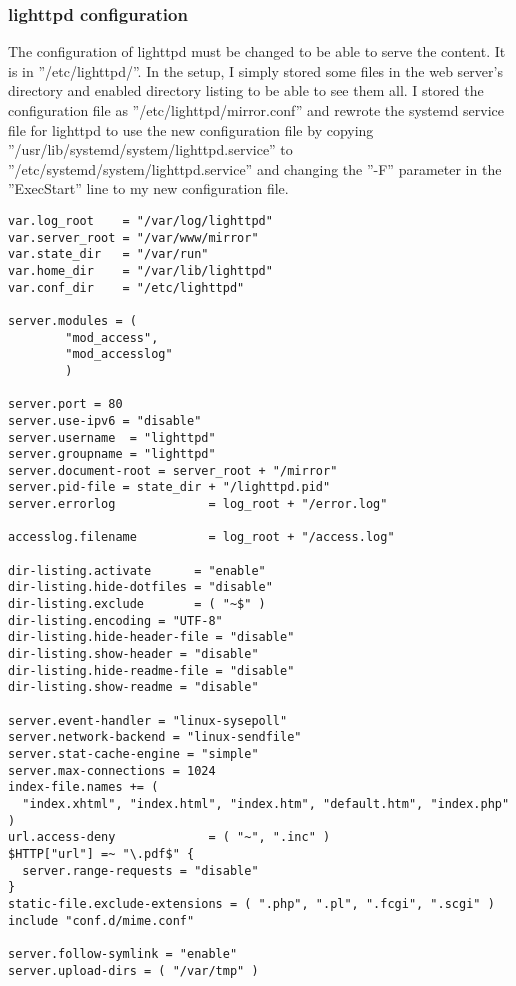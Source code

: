 \subsubsection{lighttpd configuration}
The configuration of lighttpd must be changed to be able to serve the content.
It is in ''/etc/lighttpd/''. In the setup, I simply stored some files in the web
server's directory and enabled directory listing to be able to see them all.
I stored the configuration file as ''/etc/lighttpd/mirror.conf'' and rewrote
the systemd service file for lighttpd to use the new configuration file by
copying ''/usr/lib/systemd/system/lighttpd.service'' to ''/etc/systemd/system/lighttpd.service''
and changing the ''-F'' parameter in the ''ExecStart'' line to my new configuration file.
\begin{lstlisting}
var.log_root    = "/var/log/lighttpd"
var.server_root = "/var/www/mirror"
var.state_dir   = "/var/run"
var.home_dir    = "/var/lib/lighttpd"
var.conf_dir    = "/etc/lighttpd"

server.modules = (
        "mod_access",
        "mod_accesslog"
        )

server.port = 80
server.use-ipv6 = "disable"
server.username  = "lighttpd"
server.groupname = "lighttpd"
server.document-root = server_root + "/mirror"
server.pid-file = state_dir + "/lighttpd.pid"
server.errorlog             = log_root + "/error.log"

accesslog.filename          = log_root + "/access.log"

dir-listing.activate      = "enable"
dir-listing.hide-dotfiles = "disable"
dir-listing.exclude       = ( "~$" )
dir-listing.encoding = "UTF-8"
dir-listing.hide-header-file = "disable"
dir-listing.show-header = "disable"
dir-listing.hide-readme-file = "disable"
dir-listing.show-readme = "disable"

server.event-handler = "linux-sysepoll"
server.network-backend = "linux-sendfile"
server.stat-cache-engine = "simple"
server.max-connections = 1024
index-file.names += (
  "index.xhtml", "index.html", "index.htm", "default.htm", "index.php"
)
url.access-deny             = ( "~", ".inc" )
$HTTP["url"] =~ "\.pdf$" {
  server.range-requests = "disable"
}
static-file.exclude-extensions = ( ".php", ".pl", ".fcgi", ".scgi" )
include "conf.d/mime.conf"

server.follow-symlink = "enable"
server.upload-dirs = ( "/var/tmp" )

\end{lstlisting}
